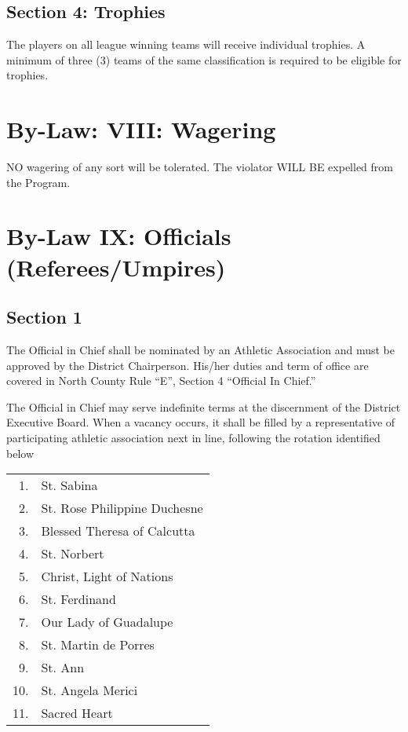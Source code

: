 \subsection{Section 4: Trophies}
The players on all league winning teams will receive individual trophies.  A minimum of three (3) teams of the same classification is required to be eligible for trophies.

\section{By-Law: VIII: Wagering}
NO wagering of any sort will be tolerated. The violator WILL BE expelled from the Program.

\section{By-Law IX: Officials (Referees/Umpires)}
\subsection{Section 1}
The Official in Chief shall be nominated by an Athletic Association and must be approved by the District Chairperson.  His/her duties and term of office are covered in North County Rule ``E'', Section 4 ``Official In Chief.''

The Official in Chief may serve indefinite terms at the discernment of the District Executive Board. When a vacancy occurs, it shall be filled by a representative of participating athletic association next in line, following the rotation identified below

\begin{center}
    \begin{tabular}{ r l }
        1. & St. Sabina \\
        2. & St. Rose Philippine Duchesne \\
        3. & Blessed Theresa of Calcutta \\
        4. & St. Norbert \\
        5. & Christ, Light of Nations \\
        6. & St. Ferdinand \\
        7. & Our Lady of Guadalupe \\
        8. & St. Martin de Porres \\
        9. & St. Ann \\
        10. & St. Angela Merici \\
        11. & Sacred Heart \\
    \end{tabular}
\end{center}


